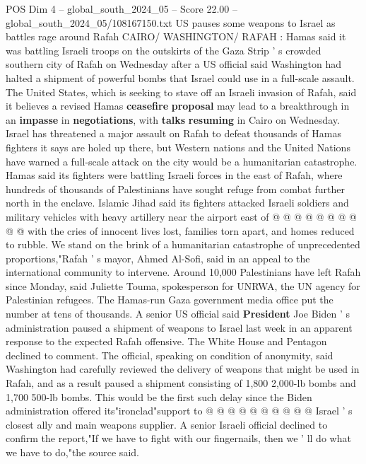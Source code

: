 \begin{textsample}{POS Dim 4 – global\_south\_2024\_05 – Score 22.00 – global\_south\_2024\_05/108167150.txt}  \label{ex:f4_pos_207}
US pauses some weapons to Israel as battles rage around Rafah CAIRO/ WASHINGTON/ RAFAH : Hamas said it was battling Israeli troops on the outskirts of the Gaza Strip ' s crowded southern city of Rafah on Wednesday after a US official said Washington had halted a shipment of powerful bombs that Israel could use in a full-scale assault.
The United States, which is seeking to stave off an Israeli invasion of Rafah, said it believes a revised Hamas \textbf{ceasefire} \textbf{proposal} may lead to a breakthrough in an \textbf{impasse} in \textbf{negotiations}, with \textbf{talks} \textbf{resuming} in Cairo on Wednesday.
Israel has threatened a major assault on Rafah to defeat thousands of Hamas fighters it says are holed up there, but Western nations and the United Nations have warned a full-scale attack on the city would be a humanitarian catastrophe.
Hamas said its fighters were battling Israeli forces in the east of Rafah, where hundreds of thousands of Palestinians have sought refuge from combat further north in the enclave.
Islamic Jihad said its fighters attacked Israeli soldiers and military vehicles with heavy artillery near the airport east of @ @ @ @ @ @ @ @ @ @ with the cries of innocent lives lost, families torn apart, and homes reduced to rubble.
We stand on the brink of a humanitarian catastrophe of unprecedented proportions,"Rafah ' s mayor, Ahmed Al-Sofi, said in an appeal to the international community to intervene.
Around 10,000 Palestinians have left Rafah since Monday, said Juliette Touma, spokesperson for UNRWA, the UN agency for Palestinian refugees.
The Hamas-run Gaza government media office put the number at tens of thousands.
A senior US official said \textbf{President} Joe Biden ' s administration paused a shipment of weapons to Israel last week in an apparent response to the expected Rafah offensive.
The White House and Pentagon declined to comment.
The official, speaking on condition of anonymity, said Washington had carefully reviewed the delivery of weapons that might be used in Rafah, and as a result paused a shipment consisting of 1,800 2,000-lb bombs and 1,700 500-lb bombs.
This would be the first such delay since the Biden administration offered its"ironclad"support to @ @ @ @ @ @ @ @ @ @ Israel ' s closest ally and main weapons supplier.
A senior Israeli official declined to confirm the report,"If we have to fight with our fingernails, then we ' ll do what we have to do,"the source said.

\end{textsample}
